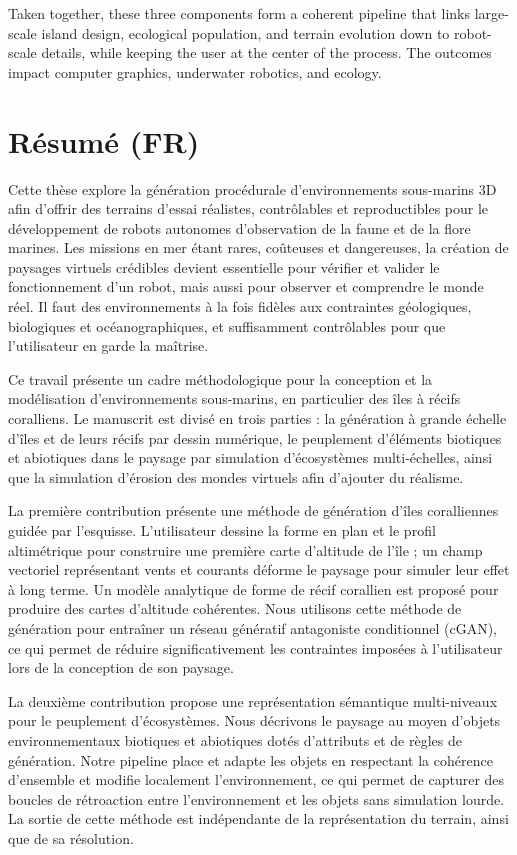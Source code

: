 Taken together, these three components form a coherent pipeline that links large-scale island design, ecological population, and terrain evolution down to robot-scale details, while keeping the user at the center of the process. The outcomes impact computer graphics, underwater robotics, and ecology.


\newpage
\section*{Résumé (FR)}
Cette thèse explore la génération procédurale d'environnements sous-marins 3D afin d'offrir des terrains d'essai réalistes, contrôlables et reproductibles pour le développement de robots autonomes d'observation de la faune et de la flore marines. Les missions en mer étant rares, coûteuses et dangereuses, la création de paysages virtuels crédibles devient essentielle pour vérifier et valider le fonctionnement d'un robot, mais aussi pour observer et comprendre le monde réel. Il faut des environnements à la fois fidèles aux contraintes géologiques, biologiques et océanographiques, et suffisamment contrôlables pour que l'utilisateur en garde la maîtrise.

Ce travail présente un cadre méthodologique pour la conception et la modélisation d'environnements sous-marins, en particulier des îles à récifs coralliens. Le manuscrit est divisé en trois parties : la génération à grande échelle d'îles et de leurs récifs par dessin numérique, le peuplement d'éléments biotiques et abiotiques dans le paysage par simulation d'écosystèmes multi-échelles, ainsi que la simulation d'érosion des mondes virtuels afin d'ajouter du réalisme.

La première contribution présente une méthode de génération d'îles coralliennes guidée par l'esquisse. L'utilisateur dessine la forme en plan et le profil altimétrique pour construire une première carte d'altitude de l'île ; un champ vectoriel représentant vents et courants déforme le paysage pour simuler leur effet à long terme. Un modèle analytique de forme de récif corallien est proposé pour produire des cartes d'altitude cohérentes. Nous utilisons cette méthode de génération pour entraîner un réseau génératif antagoniste conditionnel (cGAN), ce qui permet de réduire significativement les contraintes imposées à l'utilisateur lors de la conception de son paysage.

La deuxième contribution propose une représentation sémantique multi-niveaux pour le peuplement d'écosystèmes. Nous décrivons le paysage au moyen d'objets environnementaux biotiques et abiotiques dotés d'attributs et de règles de génération. Notre pipeline place et adapte les objets en respectant la cohérence d'ensemble et modifie localement l'environnement, ce qui permet de capturer des boucles de rétroaction entre l'environnement et les objets sans simulation lourde. La sortie de cette méthode est indépendante de la représentation du terrain, ainsi que de sa résolution.

